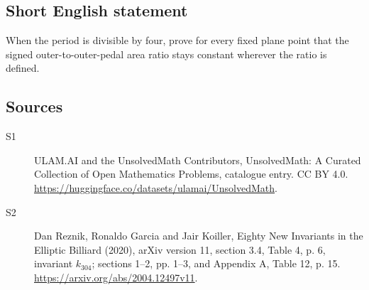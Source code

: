 \documentclass[11pt]{article}
\begin{document}
\subsection{Short English statement}
When the period is divisible by four, prove for every fixed plane point that the signed outer-to-outer-pedal area ratio stays constant wherever the ratio is defined.
\subsection{Sources}
\begin{description}
\item[\hypertarget{source:statement:1}{S1}] ULAM.AI and the UnsolvedMath Contributors, UnsolvedMath: A Curated Collection of Open Mathematics Problems, catalogue entry. CC BY 4.0. \url{https://huggingface.co/datasets/ulamai/UnsolvedMath}.
\item[\hypertarget{source:statement:2}{S2}] Dan Reznik, Ronaldo Garcia and Jair Koiller, Eighty New Invariants in the Elliptic Billiard (2020), arXiv version 11, section 3.4, Table 4, p. 6, invariant $k_{304}$; sections 1--2, pp. 1--3, and Appendix A, Table 12, p. 15. \url{https://arxiv.org/abs/2004.12497v11}.
\end{description}
\label{end:statement}
\end{document}
